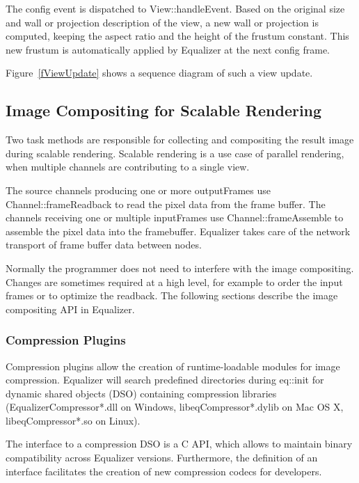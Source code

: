 \documentclass[10pt,a4]{scrartcl}
\newcommand{\fig}[1]{Figure~\ref{#1}}
\begin{document}
The config event is dispatched to \textsf{View::handleEvent}. Based on
the original size and wall or projection description of the view, a new
wall or projection is computed, keeping the aspect ratio and the height
of the frustum constant. This new frustum is automatically applied by
Equalizer at the next config frame.

\fig{fViewUpdate} shows a sequence diagram of such a view update.


\subsection{\label{sCompositing}Image Compositing for Scalable Rendering}

Two task methods are responsible for collecting and compositing the
result image during scalable rendering. Scalable rendering is a use case
of parallel rendering, when multiple channels are contributing to a single
view. 

The source channels producing one or more \textsf{outputFrame}s use
\textsf{Channel::frame\-Read\-back} to read the pixel data from the frame
buffer. The channels receiving one or multiple \textsf{inputFrame}s use
\textsf{Channel::frameAssemb\-le} to assemble the pixel data into the
framebuffer. Equalizer takes care of the network transport of frame
buffer data between nodes.

Normally the programmer does not need to interfere with the image
compositing. Changes are sometimes required at a high level, for example
to order the input frames or to optimize the readback. The following
sections describe the image compositing API in Equalizer.

\subsubsection{Compression Plugins}

Compression plugins allow the creation of runtime-loadable modules for
image compression. Equalizer will search predefined directories during
\textsf{eq::init} for dynamic shared objects (DSO) containing compression
libraries (EqualizerCompressor*.dll on Windows, libeqCompressor*.dylib
on Mac OS X, libeqCompressor*.so on Linux).

The interface to a compression DSO is a C API, which allows to maintain
binary compatibility across Equalizer versions. Furthermore, the
definition of an interface facilitates the creation of new compression
codecs for developers. 
\end{document}
